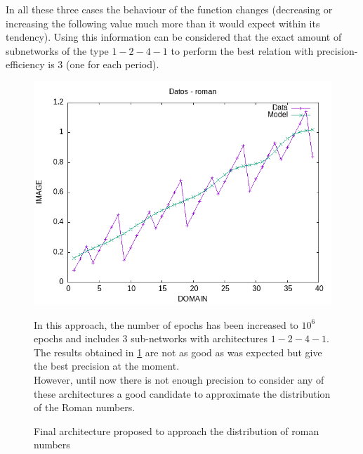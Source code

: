 \documentclass[a4paper, 11pt]{article}
\begin{document}
In all these three cases the behaviour of the function changes (decreasing or increasing the following value much more than it would expect within its tendency). Using this information can be considered that the exact amount of subnetworks of the type $1-2-4-1$ to perform the best relation with precision-efficiency is $3$ (one for each period).  
\begin{figure}[h]
    \begin{minipage}{5.5cm}
        \begin{center}
            \includegraphics[width = 1 \linewidth]{img/roman/roman_over_kill.png}
            \caption{Final architecture proposed to approach the distribution of roman numbers}
            \label{overkill-approach}
        \end{center}
    \end{minipage} \hspace{1em}
    \begin{minipage}{9cm}
 In this approach, the number of epochs has been increased to $10^6$ epochs and includes $3$ sub-networks with architectures $1-2-4-1$.\\
 The results obtained in \ref{overkill-approach} are not as good as was expected but give the best precision at the moment.\\
 However, until now there is not enough precision to consider any of these architectures a good candidate to approximate the distribution of the Roman numbers.\\
    \end{minipage}
\end{figure}\\
\end{document}
